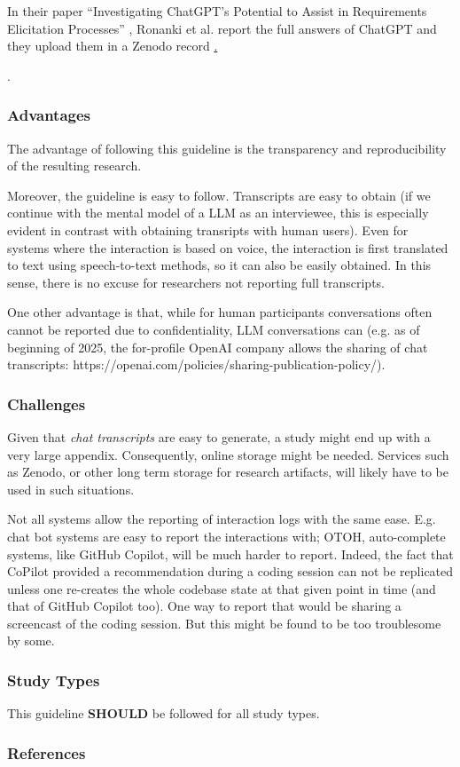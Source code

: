 \documentclass[11pt]{article}
\newcommand{\should}{\textbf{SHOULD}\xspace}
\begin{document}
In their paper ``Investigating ChatGPT's Potential to Assist in Requirements Elicitation Processes'' \cite{ronanki2023investigating}, Ronanki et al. report the full answers of ChatGPT and they upload them in a Zenodo record \href{https://zenodo.org/records/8124936}. 

. 


\subsubsection{Advantages}

The advantage of following this guideline is the transparency and reproducibility of the resulting research. 

Moreover, the guideline is easy to follow. Transcripts are easy to obtain (if we continue with the mental model of a LLM as an interviewee, this is especially evident in contrast with obtaining transripts with human users). Even for systems where the interaction is based on voice, the interaction is first translated to text using speech-to-text methods, so it can also be easily obtained. In this sense, there is no excuse for researchers not reporting full transcripts. 

One other advantage is that, while for human participants conversations often cannot be reported due to confidentiality, LLM conversations can (e.g. as of beginning of 2025, the for-profile OpenAI company allows the sharing of chat transcripts: https://openai.com/policies/sharing-publication-policy/). 


\subsubsection{Challenges}

Given that {\em chat transcripts} are easy to generate, a study might end up with a very large appendix. Consequently, online storage might be needed. Services such as Zenodo, or other long term storage for research artifacts, will likely have to be used in such situations.

Not all systems allow the reporting of interaction logs with the same ease. E.g. chat bot systems are easy to report the interactions with; OTOH, auto-complete systems, like GitHub Copilot, will be much harder to report. Indeed, the fact that CoPilot provided a recommendation during a coding session can not be replicated unless one re-creates the whole codebase state at that given point in time (and that of GitHub Copilot too). One way to report that would be sharing a screencast of the coding session. But this might be found to be too troublesome by some. 


\subsubsection{Study Types}

This guideline \should be followed for all study types. 


\subsubsection{References}



\end{document}
